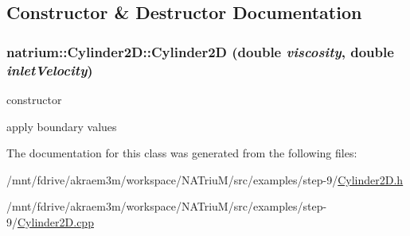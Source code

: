 \subsection{Constructor \& Destructor Documentation}
\hypertarget{classnatrium_1_1Cylinder2D_a38e5826b6fd4fc859b74783de3999658}{
\subsubsection[{Cylinder2D}]{\setlength{\rightskip}{0pt plus 5cm}natrium::Cylinder2D::Cylinder2D (double {\em viscosity}, \/  double {\em inletVelocity})}}
\label{classnatrium_1_1Cylinder2D_a38e5826b6fd4fc859b74783de3999658}


constructor 

apply boundary values 

The documentation for this class was generated from the following files:\begin{DoxyCompactItemize}
\item 
/mnt/fdrive/akraem3m/workspace/NATriuM/src/examples/step-\/9/\hyperlink{Cylinder2D_8h}{Cylinder2D.h}\item 
/mnt/fdrive/akraem3m/workspace/NATriuM/src/examples/step-\/9/\hyperlink{Cylinder2D_8cpp}{Cylinder2D.cpp}\end{DoxyCompactItemize}
